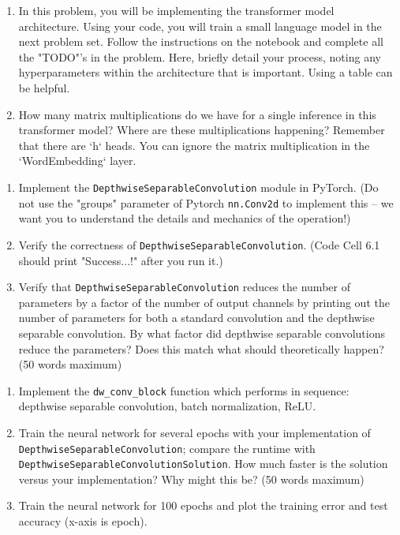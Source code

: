 \documentclass[a4 paper]{article}
\newcommand{\pya}[1]{\texttt{#1}}
\begin{document}
\solution{}


{}
\begin{enumerate}
    \item In this problem, you will be implementing the transformer model architecture. Using your code, you will train a small language model in the next problem set. Follow the instructions on the notebook and complete all the "TODO"'s in the problem. Here, briefly detail your process, noting any hyperparameters within the architecture that is important. Using a table can be helpful.

    \item How many matrix multiplications do we have for a single inference in this transformer model? Where are these multiplications happening? Remember that there are `h` heads. You can ignore the matrix multiplication in the `WordEmbedding` layer.
\end{enumerate}

\solution{}


{}
\begin{enumerate}
    \item Implement the \pya{DepthwiseSeparableConvolution} module in PyTorch. (Do not use the "groups" parameter of Pytorch \pya{nn.Conv2d} to implement this -- we want you to understand the details and mechanics of the operation!)
    \item Verify the correctness of \pya{DepthwiseSeparableConvolution}. (Code Cell 6.1 should print "Success...!" after you run it.)
    \item Verify that \pya{DepthwiseSeparableConvolution} reduces the number of parameters by a factor of the number of output channels by printing out the number of parameters for both a standard convolution and the depthwise separable convolution. By what factor did depthwise separable convolutions reduce the parameters? Does this match what should theoretically happen? (50 words maximum)

\end{enumerate}

\solution{}


{}
\begin{enumerate}
    \item Implement the \pya{dw_conv_block} function which performs in sequence: depthwise separable convolution, batch normalization, ReLU.
    \item Train the neural network for several epochs with your implementation of \pya{DepthwiseSeparableConvolution}; compare the runtime with \pya{DepthwiseSeparableConvolutionSolution}. How much faster is the solution versus your implementation? Why might this be? (50 words maximum)
    \item Train the neural network for 100 epochs and plot the training error and test accuracy (x-axis is epoch).
\end{enumerate}
\end{document}
